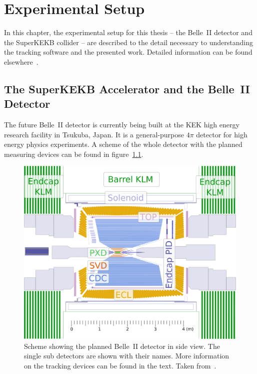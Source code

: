 \chapter{Experimental Setup} \label{chapter-ex}
In this chapter, the experimental setup for this thesis -- the Belle~II detector and the SuperKEKB collider -- are described to the detail necessary to understanding the tracking software and the presented work. Detailed information can be found elsewhere~\cite{tdr}.


\section{The SuperKEKB Accelerator and the Belle~II Detector}

The future Belle~II detector is currently being built at the KEK high energy research facility in Tsukuba, Japan. It is a general-purpose $4\pi$ detector for high energy physics experiments. A scheme of the whole detector with the planned measuring devices can be found in figure~\ref{fig-belle2}.

\begin{figure}[t]
 \centering
 \includegraphics[height=0.35\textheight]{figures/experimental_setup/detector_crossection_labels.pdf}
 \caption[Schema of the planned Belle~II detector.]{Scheme showing the planned Belle~II detector in side view. The single sub detectors are shown with their names. More information on the tracking devices can be found in the text. Taken from~\cite{christian}.}
 \label{fig-belle2}
\end{figure}

